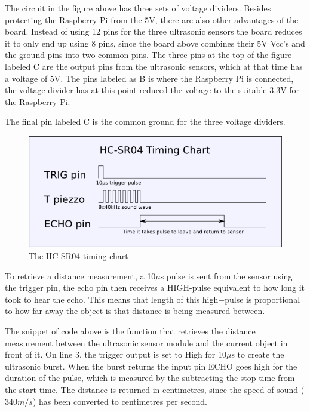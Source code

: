 The circuit in the figure above has three sets of voltage dividers. Besides protecting the Raspberry Pi from the 5V, there are also other advantages of the board. Instead of using 12 pins for the three ultrasonic sensors the board reduces it to only end up using 8 pins, since the board above combines their 5V Vcc's and the ground pins into two common pins.  
The three pins at the top of the figure labeled C are the output pins from the ultrasonic sensors, which at that time has a voltage of 5V. The pins labeled as B is where the Raspberry Pi is connected, the voltage divider has at this point reduced the voltage to the suitable 3.3V for the Raspberry Pi.  

The final pin labeled C is the common ground for the three voltage dividers.

\begin{figure}[H]
	\centering
	\includegraphics[width=.45\linewidth]{images/hcsr04timingchart.png}
	\caption{The HC-SR04 timing chart\cite{hcsr04timingchart}}
	\label{fig:timingchartpic}
\end{figure}

To retrieve a distance measurement, a 10$\mu$s pulse is sent from the sensor using the trigger pin, the echo pin then receives a HIGH-pulse equivalent to how long it took to hear the echo. This means that length of this high$-$pulse is proportional to how far away the object is that distance is being measured between\cite{ultrasonichowitworks}.



The snippet of code above is the function that retrieves the distance measurement between the ultrasonic sensor module and the current object in front of it.
On line 3, the trigger output is set to High for 10$\mu$s to create the ultrasonic burst. When the burst returns the input pin ECHO goes high for the duration of the pulse, which is measured by the subtracting the stop time from the start time.
The distance is returned in centimetres, since the speed of sound ($340m/s$) has been converted to centimetres per second.
